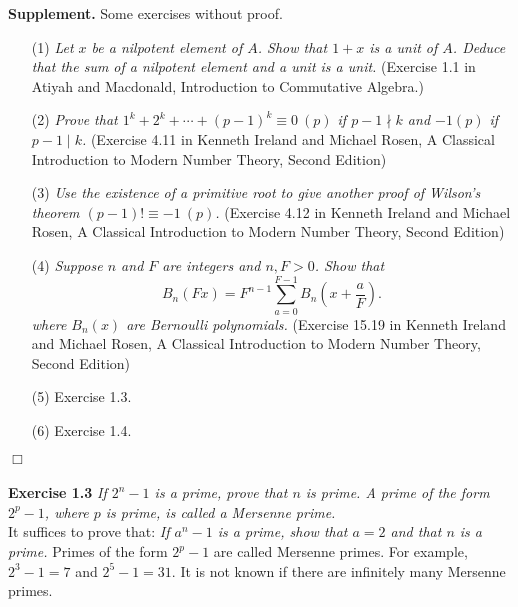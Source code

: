 \documentclass{article}
\begin{document}
\textbf{Supplement.} Some exercises without proof.
\begin{enumerate}
\item[(1)]
\emph{Let $x$ be a nilpotent element of $A$.
Show that $1+x$ is a unit of $A$.
Deduce that the sum of a nilpotent element and a unit is a unit.}
(Exercise 1.1 in Atiyah and Macdonald,
Introduction to Commutative Algebra.)

\item[(2)]
\emph{Prove that $1^k + 2^k + \cdots + (p-1)^k \equiv 0 \: (p)$
if $p - 1 \nmid k$ and $-1 (p)$ if $p - 1 \mid k$.}
(Exercise 4.11 in Kenneth Ireland and Michael Rosen,
A Classical Introduction to Modern Number Theory, Second Edition)

\item[(3)]
\emph{Use the existence of a primitive root to give another proof
of Wilson's theorem $(p - 1)! \equiv -1 \: (p)$.}
(Exercise 4.12 in Kenneth Ireland and Michael Rosen,
A Classical Introduction to Modern Number Theory, Second Edition)

\item[(4)]
\emph{Suppose $n$ and $F$ are integers and $n, F > 0$. Show that
$$B_n(Fx) = F^{n-1} \sum_{a=0}^{F-1} B_n \left(x + \frac{a}{F} \right).$$
where $B_n(x)$ are Bernoulli polynomials.}
(Exercise 15.19 in Kenneth Ireland and Michael Rosen,
A Classical Introduction to Modern Number Theory, Second Edition)

\item[(5)]
Exercise 1.3.

\item[(6)]
Exercise 1.4.
\end{enumerate}
$\Box$ \\\\



\textbf{Exercise 1.3}
\emph{If $2^n - 1$ is a prime, prove that $n$ is prime.
A prime of the form $2^p - 1$, where $p$ is prime, is called a Mersenne prime.} \\

It suffices to prove that:
\emph{If $a^n - 1$ is a prime, show that $a = 2$ and that $n$ is a prime.}
Primes of the form $2^p - 1$ are called Mersenne primes.
For example, $2^3 - 1 = 7$ and $2^5 - 1 = 31$.
It is not known if there are infinitely many Mersenne primes. \\
\end{document}
